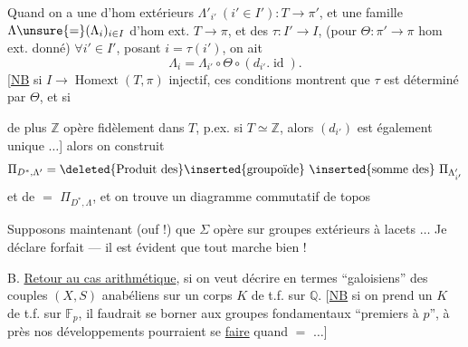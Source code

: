 Quand on a une   d'hom
extérieurs \(\Lambda'_{i'}\ (i'\in I'):T\longrightarrow\pi'\), et une
famille \(\Lambda\unsure{=}(\Lambda_i)_{i\in I}\) d'hom ext. \(T\longrightarrow\pi\), et des
\(\tau:I'\longrightarrow I\), 
(pour \(\Theta:\pi'\longrightarrow\pi\) hom ext. donné)
\(\forall i'\in I'\), posant \(i=\tau(i')\), on ait
\[
\Lambda_i=\Lambda_{i'}\circ\Theta\circ(d_{i'}.\operatorname{id}).
\]
[\uline{NB} si \(I\longrightarrow\operatorname{Homext}(T,\pi)\) injectif, ces conditions
montrent que \(\tau\) est déterminé par \(\Theta\), et si

de plus \(\mathbb Z\) opère fidèlement dans \(T\), p.ex.
si \(T\simeq\mathbb Z\), alors \((d_{i'})\) est également unique \(\ldots\)]
alors on construit 
\[
\Pi_{D^*,\Lambda'}=
\deleted{\text{Produit des}}\inserted{\text{groupoïde}}\ \inserted{\text{somme des}}\ \Pi_{\Lambda'_{i'}}
\]
et de \(=\) \(\Pi_{D^*,\Lambda}\), et on trouve un
diagramme commutatif de topos

Supposons maintenant (ouf !) que
\(\Sigma\) opère sur groupes extérieurs à lacets \(\ldots\)
Je déclare forfait --- il est évident que
tout marche bien !

B. \uline{Retour au cas arithmétique}, si on
veut décrire en termes ``galoisiens'' des
couples \((X,S)\)  anabéliens  sur un corps
\(K\) de t.f. sur \(\mathbb Q\). [\uline{NB} si on prend
un \(K\) de t.f. sur \(\mathbb F_p\), il faudrait se
borner aux groupes fondamentaux ``premiers à
\(p\)'', à  près nos développements pourraient
se \uline{faire} quand \(=\) \(\ldots\)]

